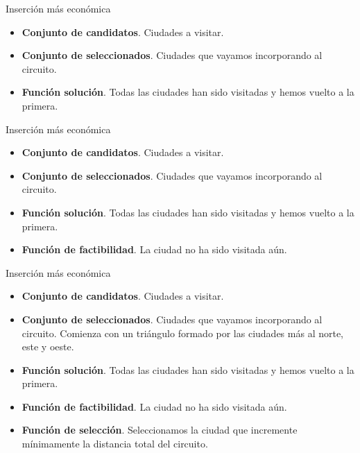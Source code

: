 \documentclass{beamer}
\begin{document}
\begin{frame}[fragile]{Inserción más económica}

\begin{itemize}
	\item \textbf{Conjunto de candidatos}. Ciudades a visitar.
	\item \textbf{Conjunto de seleccionados}. Ciudades que vayamos incorporando al circuito.
	\item \textbf{Función solución}. Todas las ciudades han sido visitadas y hemos vuelto a la primera.
\end{itemize}

\end{frame}

\begin{frame}[fragile]{Inserción más económica}

\begin{itemize}
	\item \textbf{Conjunto de candidatos}. Ciudades a visitar.
	\item \textbf{Conjunto de seleccionados}. Ciudades que vayamos incorporando al circuito.
	\item \textbf{Función solución}. Todas las ciudades han sido visitadas y hemos vuelto a la primera.
	\item \textbf{Función de factibilidad}. La ciudad no ha sido visitada aún.
\end{itemize}

\end{frame}

\begin{frame}[fragile]{Inserción más económica}

\begin{itemize}
	\item \textbf{Conjunto de candidatos}. Ciudades a visitar.
	\item \textbf{Conjunto de seleccionados}. Ciudades que vayamos incorporando al circuito. Comienza con un triángulo formado por las ciudades más al norte, este y oeste.
	\item \textbf{Función solución}. Todas las ciudades han sido visitadas y hemos vuelto a la primera.
	\item \textbf{Función de factibilidad}. La ciudad no ha sido visitada aún.
	\item \textbf{Función de selección}. Seleccionamos la ciudad que incremente mínimamente la distancia total del circuito.
\end{itemize}

\end{frame}
\end{document}
